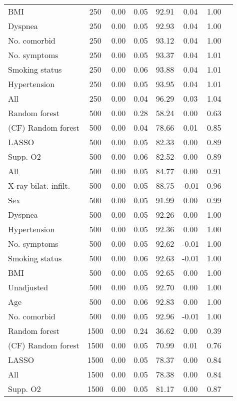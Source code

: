 \documentclass{article}
\begin{document}
{\begin{longtable}{lccccccc}
BMI & 250 & 0.00 & 0.05 &  92.91 &  0.04 & 1.00 \\ 
Dyspnea & 250 & 0.00 & 0.05 &  92.93 &  0.04 & 1.00 \\ 
No. comorbid & 250 & 0.00 & 0.05 &  93.12 &  0.04 & 1.00 \\ 
No. symptoms & 250 & 0.00 & 0.05 &  93.37 &  0.04 & 1.01 \\ 
Smoking status & 250 & 0.00 & 0.06 &  93.88 &  0.04 & 1.01 \\ 
Hypertension & 250 & 0.00 & 0.05 &  93.95 &  0.04 & 1.01 \\ 
All & 250 & 0.00 & 0.04 &  96.29 &  0.03 & 1.04 \\ \midrule() 
Random forest & 500 & 0.00 & 0.28 &  58.24 &  0.00 & 0.63 \\ 
(CF) Random forest & 500 & 0.00 & 0.04 &  78.66 &  0.01 & 0.85 \\ 
LASSO & 500 & 0.00 & 0.05 &  82.33 &  0.00 & 0.89 \\ 
Supp. O2 & 500 & 0.00 & 0.06 &  82.52 &  0.00 & 0.89 \\ 
All & 500 & 0.00 & 0.05 &  84.77 &  0.00 & 0.91 \\ 
X-ray bilat. infilt. & 500 & 0.00 & 0.05 &  88.75 & -0.01 & 0.96 \\ 
Sex & 500 & 0.00 & 0.05 &  91.99 &  0.00 & 0.99 \\ 
Dyspnea & 500 & 0.00 & 0.05 &  92.26 &  0.00 & 1.00 \\ 
Hypertension & 500 & 0.00 & 0.05 &  92.36 &  0.00 & 1.00 \\ 
No. symptoms & 500 & 0.00 & 0.05 &  92.62 & -0.01 & 1.00 \\ 
Smoking status & 500 & 0.00 & 0.06 &  92.63 & -0.01 & 1.00 \\ 
BMI & 500 & 0.00 & 0.05 &  92.65 &  0.00 & 1.00 \\ 
Unadjusted & 500 & 0.00 & 0.05 &  92.70 &  0.00 & 1.00 \\ 
Age & 500 & 0.00 & 0.06 &  92.83 &  0.00 & 1.00 \\ 
No. comorbid & 500 & 0.00 & 0.05 &  92.96 & -0.01 & 1.00 \\ \midrule() 
Random forest & 1500 & 0.00 & 0.24 &  36.62 &  0.00 & 0.39 \\ 
(CF) Random forest & 1500 & 0.00 & 0.05 &  70.99 &  0.01 & 0.76 \\ 
LASSO & 1500 & 0.00 & 0.05 &  78.37 &  0.00 & 0.84 \\ 
All & 1500 & 0.00 & 0.05 &  78.38 &  0.00 & 0.84 \\ 
Supp. O2 & 1500 & 0.00 & 0.05 &  81.17 &  0.00 & 0.87 \\ 

\end{longtable}}
\end{document}
